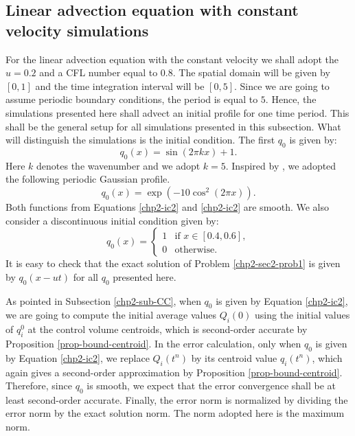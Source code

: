 \subsection{Linear advection equation with constant velocity simulations}
\label{chp2-sec-numerical-exp-1}
For the linear advection equation with the constant velocity we shall adopt the $u=0.2$ and 
a CFL number equal to $0.8$.
The spatial domain will be given by $[0,1]$ and the time integration interval will be $[0,5]$.
Since we are going to assume periodic boundary conditions, the period is equal to $5$. 
Hence, the simulations presented here shall advect an initial profile for one time period. 
This shall be the general setup for all simulations presented in this subsection. 
What will distinguish the simulations is the initial condition.
The first $q_0$ is given by:
\begin{equation}
	\label{chp2-ic1}
	q_0(x) = \sin (2\pi k x) + 1.
\end{equation}
Here $k$ denotes the wavenumber and we adopt $k=5$.
Inspired by \citet{trefethen:2000}, we adopted the following periodic Gaussian profile.
\begin{equation}
	\label{chp2-ic2}
		q_0(x) = \exp(-10\cos^2 (2\pi x)).
\end{equation}
Both functions from Equations \eqref{chp2-ic2} and \eqref{chp2-ic2} are smooth.
We also consider a discontinuous initial condition given by:
\begin{equation}
	\label{chp2-ic3}
		q_0(x) =  
  \begin{cases}
		1 & \text{if } x \in [0.4,0.6],\\
		0 & \text{otherwise}.
  \end{cases}
\end{equation}
It is easy to check that the  exact solution of Problem \ref{chp2-sec2-prob1}
is given by $q_0(x-ut)$ for all $q_0$ presented here.

As pointed in Subsection \ref{chp2-sub-CC}, when $q_0$ is given by Equation \eqref{chp2-ic2},
we are going to compute the initial average values $Q_i(0)$ using
the initial values of $q^0_i$ at the control volume centroids, which is second-order 
accurate by Proposition \ref{prop-bound-centroid}.
In the error calculation, only when $q_0$ is given by Equation \eqref{chp2-ic2},
we replace $Q_{i}(t^n)$ by its centroid value $q_{i}(t^n)$, which again gives
a second-order approximation by Proposition \ref{prop-bound-centroid}.
Therefore, since $q_0$ is smooth, we expect that the error convergence shall be at least second-order accurate.
Finally, the error norm is normalized by dividing the error norm by the exact solution norm. 
The norm adopted here is the maximum norm.

